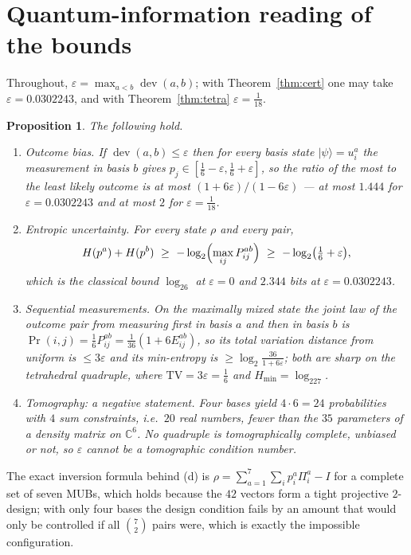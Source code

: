\documentclass[11pt,a4paper]{article}
\newtheorem{proposition}[theorem]{Proposition}
\theoremstyle{remark}
\newcommand{\C}{\mathbb{C}}
\newcommand{\dev}{\operatorname{dev}}
\newcommand{\eps}{\varepsilon}
\begin{document}
\section{Quantum-information reading of the bounds}
\label{sec:qi}

Throughout, $\eps=\max_{a<b}\dev(a,b)$; with Theorem~\ref{thm:cert} one may take
$\eps=0.0302243$, and with Theorem~\ref{thm:tetra} $\eps=\tfrac1{18}$.

\begin{proposition}\label{prop:qi}
The following hold.
\begin{enumerate}[label=(\alph*)]
\item \emph{Outcome bias.}  If $\dev(a,b)\le\eps$ then for every basis state
$|\psi\rangle=u^a_i$ the measurement in basis $b$ gives $p_j\in[\tfrac16-\eps,\tfrac16+\eps]$,
so the ratio of the most to the least likely outcome is at most
$(1+6\eps)/(1-6\eps)$ --- at most $1.444$ for $\eps=0.0302243$ and at most $2$ for
$\eps=\tfrac1{18}$.
\item \emph{Entropic uncertainty.}  For every state $\rho$ and every pair,
\[
H(p^a)+H(p^b)\ \ge\ -\log_2\Bigl(\max_{ij}P^{ab}_{ij}\Bigr)\ \ge\ -\log_2\bigl(\tfrac16+\eps\bigr),
\]
which is the classical bound $\log_26$ at $\eps=0$ and $2.344$ bits at $\eps=0.0302243$.
\item \emph{Sequential measurements.}  On the maximally mixed state the joint law of the
outcome pair from measuring first in basis $a$ and then in basis $b$ is
$\Pr(i,j)=\tfrac16P^{ab}_{ij}=\tfrac1{36}(1+6E^{ab}_{ij})$, so its total variation distance
from uniform is $\le3\eps$ and its min-entropy is $\ge\log_2\frac{36}{1+6\eps}$; both are
sharp on the tetrahedral quadruple, where $\mathrm{TV}=3\eps=\tfrac16$ and
$H_{\min}=\log_227$.
\item \emph{Tomography: a negative statement.}  Four bases yield $4\cdot6=24$ probabilities
with $4$ sum constraints, i.e.\ $20$ real numbers, fewer than the $35$ parameters of a density
matrix on $\C^6$.  No quadruple is tomographically complete, unbiased or not, so $\eps$ cannot
be a tomographic condition number.
\end{enumerate}
\end{proposition}
The exact inversion formula behind (d) is $\rho=\sum_{a=1}^{7}\sum_ip^a_i\Pi^a_i-I$ for a
complete set of seven MUBs, which holds because the $42$ vectors form a tight projective
$2$-design; with only four bases the design condition fails by an amount that would only be
controlled if all $\binom72$ pairs were, which is exactly the impossible configuration.
\end{document}
